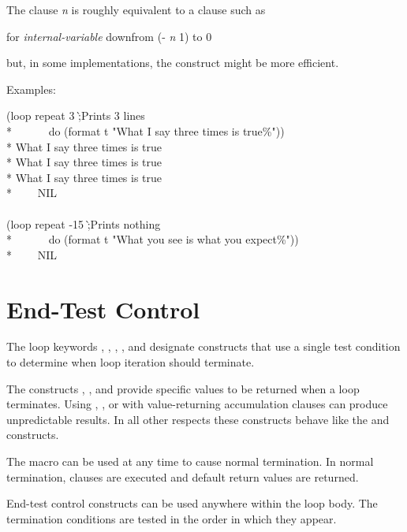 \begin{new}
\begin{defloop}
  The clause  {\it n} is roughly equivalent to a clause
  such as 
\begin{lisp}
for {\it internal-variable} downfrom (- {\it n} 1) to 0
\end{lisp}
but, in some implementations, the  construct might 
   be more efficient.


Examples:
\begin{lisp}
(loop repeat 3 \`;{\rm Prints 3 lines}\\*
~~~~~~do (format t "What I say three times is true{\Xtilde}\%")) \\*
What I say three times is true \\*
What I say three times is true \\*
What I say three times is true \\*
~~~\EV~NIL \\
 \\
(loop repeat -15 \`;{\rm Prints nothing}\\*
~~~~~~do (format t "What you see is what you expect{\Xtilde}\%")) \\*
~~~\EV~NIL
\end{lisp}
\end{defloop}



\section{End-Test Control}
\label{LOOP-TEST-SECTION}

The loop keywords , , ,
, and  designate constructs that use a single test 
condition to determine when loop iteration should terminate.

The constructs , , and  provide
specific values to be returned when a loop terminates.  
Using , , or  with 
value-returning accumulation clauses can produce unpredictable results.
In all other respects these
constructs behave like the  and  constructs.

The macro  can be used at any time to cause normal
termination.  In normal termination,  clauses are 
executed and default return values are returned.

End-test control constructs can be used anywhere within the loop
body.  The termination conditions are tested in the order in which
they appear.


\end{new}
